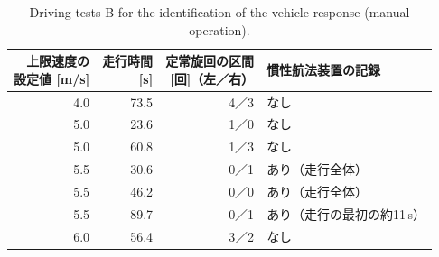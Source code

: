 \begin{table}[!htbp]
  \centering
  \caption[Driving tests B for the identification of the vehicle response.]{Driving tests B for the identification of the vehicle response (manual operation).}
  \label{tab:ident_runs_b}
  \small
  \begin{lrbox}{\tblbox}\setlength{\tabcolsep}{5pt}\begin{tabular}{rrrl}
    \toprule
    \shortstack[r]{上限速度の\\設定値 {[m/s]}} & \shortstack[r]{走行時間\\{[s]}} & \shortstack[r]{定常旋回の区間\\{[回]（左／右）}} & 慣性航法装置の記録 \\
    \midrule
    4.0 & 73.5 & 4／3 & なし \\
    5.0 & 23.6 & 1／0 & なし \\
    5.0 & 60.8 & 1／3 & なし \\
    5.5 & 30.6 & 0／1 & あり（走行全体） \\
    5.5 & 46.2 & 0／0 & あり（走行全体） \\
    5.5 & 89.7 & 0／1 & あり（走行の最初の約11\,s） \\
    6.0 & 56.4 & 3／2 & なし \\
    \bottomrule
  \end{tabular}\end{lrbox}\usebox{\tblbox}
\end{table}


